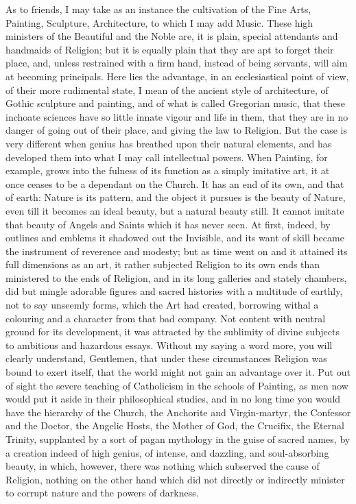As to friends, I may take as an instance the cultivation of the
Fine Arts, Painting, Sculpture, Architecture, to which I may add
Music. These high ministers of the Beautiful and the Noble are, it is
plain, special attendants and handmaids of Religion; but it is equally
plain that they are apt to forget their place, and, unless restrained
with a firm hand, instead of being servants, will aim at becoming
principals. Here lies the advantage, in an ecclesiastical point of
view, of their more rudimental state, I mean of the ancient style of
architecture, of Gothic sculpture and painting, and of what is
called Gregorian music, that these inchoate sciences have so little
innate vigour and life in them, that they are in no danger of going
out of their place, and giving the law to Religion. But the case is
very different when genius has breathed upon their natural elements,
and has developed them into what I may call intellectual powers. When
Painting, for example, grows into the fulness of its function as a
simply imitative art, it at once ceases to be a dependant on the
Church. It has an end of its own, and that of earth: Nature is its
pattern, and the object it pursues is the beauty of Nature, even till
it becomes an ideal beauty, but a natural beauty still. It cannot
imitate that beauty of Angels and Saints which it has never seen. At
first, indeed, by outlines and emblems it shadowed out the Invisible,
and its want of skill became the instrument of reverence and modesty;
but as time went on and it attained its full dimensions as an art, it
rather subjected Religion to its own ends than ministered to the ends
of Religion, and in its long galleries and stately chambers, did but
mingle adorable figures and sacred histories with a multitude of
earthly, not to say unseemly forms, which the Art had created,
borrowing withal a colouring and a character from that bad company.
Not content with neutral ground for its development, it was attracted
by the sublimity of divine subjects to ambitious and hazardous essays.
Without my saying a word more, you will clearly understand, Gentlemen,
that under these circumstances Religion was bound to exert itself,
that the world might not gain an advantage over it. Put out of sight
the severe teaching of Catholicism in the schools of Painting, as men
now would put it aside in their philosophical studies, and in no long
time you would have the hierarchy of the Church, the Anchorite and
Virgin-martyr, the Confessor and the Doctor, the Angelic Hosts,
the Mother of God, the Crucifix, the Eternal Trinity, supplanted by a
sort of pagan mythology in the guise of sacred names, by a creation
indeed of high genius, of intense, and dazzling, and soul-absorbing
beauty, in which, however, there was nothing which subserved the cause
of Religion, nothing on the other hand which did not directly or
indirectly minister to corrupt nature and the powers of darkness.

